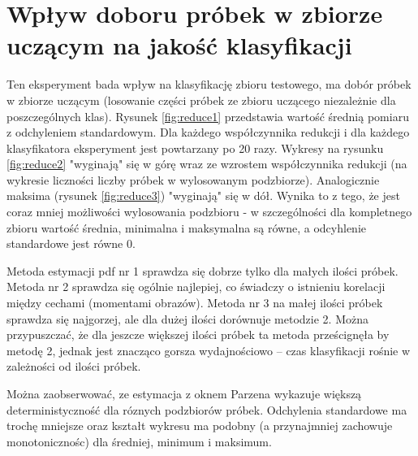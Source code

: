 \documentclass[a4paper]{article}
\begin{document}
\section{Wpływ doboru próbek w zbiorze uczącym na jakość klasyfikacji}\label{reduce}

Ten eksperyment bada wpływ na klasyfikację zbioru testowego, ma dobór próbek w zbiorze
uczącym (losowanie części próbek ze zbioru uczącego niezależnie dla poszczególnych klas).
Rysunek \ref{fig:reduce1} przedstawia wartość średnią pomiaru z odchyleniem standardowym.
Dla każdego współczynnika redukcji i dla każdego klasyfikatora eksperyment jest powtarzany po 20 razy.
Wykresy na rysunku \ref{fig:reduce2} "wyginają" się w górę wraz ze wzrostem współczynnika redukcji
(na wykresie liczności liczby próbek w wylosowanym podzbiorze).
Analogicznie maksima (rysunek \ref{fig:reduce3}) "wyginają" się w dół.
Wynika to z tego, że jest coraz mniej możliwości wylosowania podzbioru - w szczególności dla kompletnego zbioru wartość średnia, minimalna i maksymalna są równe,
a odcyhlenie standardowe jest równe 0.

Metoda estymacji pdf nr 1 sprawdza się dobrze tylko dla małych ilości próbek.
Metoda nr 2 sprawdza się ogólnie najlepiej, co świadczy o istnieniu korelacji między cechami (momentami obrazów).
Metoda nr 3 na małej ilości próbek sprawdza się najgorzej, ale dla dużej ilości dorównuje metodzie 2.
Można przypuszczać, że dla jeszcze większej ilości próbek ta metoda prześcignęła by metodę 2,
jednak jest znacząco gorsza wydajnościowo -- czas klasyfikacji rośnie w zależności od ilości próbek.

Można zaobserwować, ze estymacja z oknem Parzena wykazuje większą deterministyczność dla róznych podzbiorów próbek.
Odchylenia standardowe ma trochę mniejsze oraz kształt wykresu ma podobny
(a przynajmniej zachowuje monotonicznośc) dla średniej, minimum i maksimum.
\end{document}
